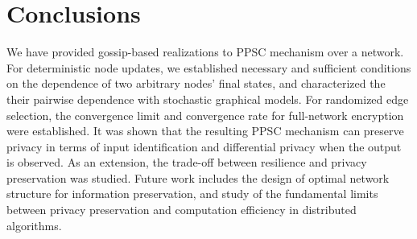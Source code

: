 \documentclass[a4paper, 11pt]{article}
\newcommand{\1}{\mathbf{1}}
\begin{document}
\section{Conclusions}\label{sec:conclusion}
We have provided gossip-based realizations to PPSC mechanism over a network.  For deterministic node updates, we established   necessary and sufficient conditions on the dependence of two arbitrary nodes' final states,  and characterized the their pairwise dependence with stochastic graphical models. For randomized edge selection, the convergence limit and convergence rate for full-network encryption were established. It was shown that the resulting PPSC mechanism can preserve privacy in terms of input identification and differential privacy when the output is observed.  As an extension, the trade-off between resilience and privacy preservation was studied. Future work includes the design of optimal network structure for information preservation, and study of the fundamental limits between privacy preservation and computation efficiency in distributed algorithms.






%

\medskip

\medskip
\end{document}
